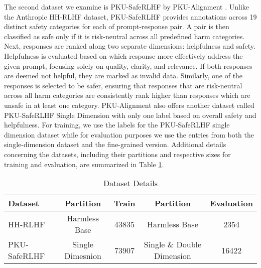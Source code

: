 \documentclass{article}
\begin{document}
The second dataset we examine is PKU-SafeRLHF by PKU-Alignment \cite{ji2024pkusaferlhfsafetyalignmentpreference}. Unlike the Anthropic HH-RLHF dataset, PKU-SafeRLHF provides annotations across 19 distinct safety categories for each of prompt-response pair. A pair is then classified as safe only if it is risk-neutral across all predefined harm categories. Next, responses are ranked along two separate dimensions: helpfulness and safety. Helpfulness is evaluated based on which response more effectively address the given prompt, focusing solely on quality, clarity, and relevance. If both responses are deemed not helpful, they are marked as invalid data. Similarly, one of the responses is selected to be safer, ensuring that responses that are risk-neutral across all harm categories are consistently rank higher than responses which are unsafe in at least one category. PKU-Alignment also offers another dataset called PKU-SafeRLHF Single Dimension with only one label based on overall safety and helpfulness. For training, we use the labels for the PKU-SafeRLHF single dimension dataset while for evaluation purposes we use the entries from both the single-dimension dataset and the fine-grained version. Additional details concerning the datasets, including their partitions and respective sizes for training and evaluation, are summarized in Table \ref{tab:datasets}.

\begin{table}[h!]
\centering
\caption{Dataset Details}
\label{tab:datasets}
\small %
\setlength{\tabcolsep}{4pt} %
\renewcommand{\arraystretch}{1.0} %
\begin{tabular}{lcccc}
\toprule
\textbf{Dataset}     & \textbf{Partition}      & \textbf{Train} &  \textbf{Partition} &\textbf{Evaluation} \\ \midrule
HH-RLHF              & Harmless Base           & 43835      & Harmless Base    & 2354          \\
PKU-SafeRLHF         & Single Dimesnion     & 73907     & Single \& Double Dimension     & 16422          \\ \bottomrule
\end{tabular}
\end{table}
\end{document}
